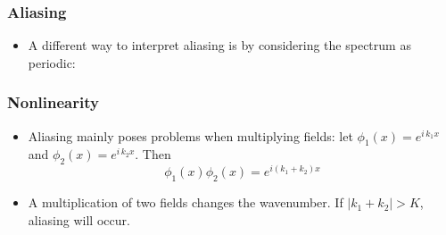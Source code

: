 \documentclass[aspectratio=149,9pt]{beamer}
\begin{document}
%
\begin{frame}
	\frametitle{Aliasing}
	\vfill\begin{itemize}
		\item A different way to interpret aliasing is by considering the spectrum as periodic:
			\begin{center}
				\only<2>{\scalebox{.7}{\small}}%
				\only<3->{\scalebox{.7}{\small}}%
			\end{center}\vfill
	\end{itemize}\vfill
\end{frame}
%
%
\begin{frame}
	\frametitle{Nonlinearity}
	\vfill\begin{itemize}
		\item Aliasing mainly poses problems when multiplying fields: let $\phi_1(x)=e^{i\,k_1 x}$ and $\phi_2(x)=e^{i\,k_2 x}$. Then
			\begin{equation*}
				\phi_1(x) \phi_2(x) = e^{i(k_1+k_2) x}
			\end{equation*}\vfill
		\item A multiplication of two fields changes the wavenumber. If $|k_1+k_2|>K$, aliasing will occur.
	\end{itemize}\vfill
\end{frame}
%
%
\end{document}

